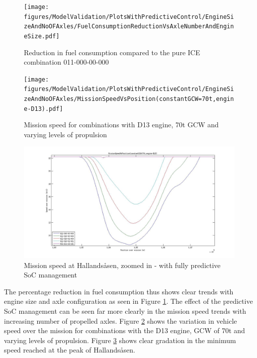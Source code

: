 \documentclass[ExampleMasters.tex]{subfiles}
\begin{document}
\begin{figure}[h!]
\centering
\texttt{[image: figures/ModelValidation/PlotsWithPredictiveControl/EngineSizeAndNoOFAxles/FuelConsumptionReductionVsAxleNumberAndEngineSize.pdf]}
\caption{Reduction in fuel consumption compared to the pure ICE combination 011-000-00-000}
\label{fuelReductionAxleEnginePredictiveSoC}
\end{figure}

\begin{figure}[h!]
\centering
\texttt{[image: figures/ModelValidation/PlotsWithPredictiveControl/EngineSizeAndNoOFAxles/MissionSpeedVsPosition(constantGCW=70t,engine-D13).pdf]}
\caption{Mission speed for combinations with D13 engine, 70t GCW and varying levels of propulsion}
\label{globalMissionSpeedIncreasedPropulsionPredictiveSoC}
\end{figure}

\begin{figure}[h!]
\centering
\includegraphics[width=\linewidth]{figures/ModelValidation/PlotsWithPredictiveControl/EngineSizeAndNoOFAxles/MissionSpeedZoomedIn.jpg}
\caption{Mission speed at Hallands\aa sen, zoomed in - with fully predictive SoC management}
\label{missionSpeedZoomedInIncreasedPropulsionPredictiveSoC}
\end{figure} 

The percentage reduction in fuel consumption thus shows clear trends with engine size and axle configuration as seen in Figure \ref{fuelReductionAxleEnginePredictiveSoC}. The effect of the predictive SoC management can be seen far more clearly in the mission speed trends with increasing number of propelled axles. Figure \ref{globalMissionSpeedIncreasedPropulsionPredictiveSoC} shows the variation in vehicle speed over the mission for combinations with the D13 engine, GCW of 70t and varying levels of propulsion. Figure \ref{missionSpeedZoomedInIncreasedPropulsionPredictiveSoC} shows clear gradation in the minimum speed reached at the peak of Hallands\aa sen.\\
\end{document}

